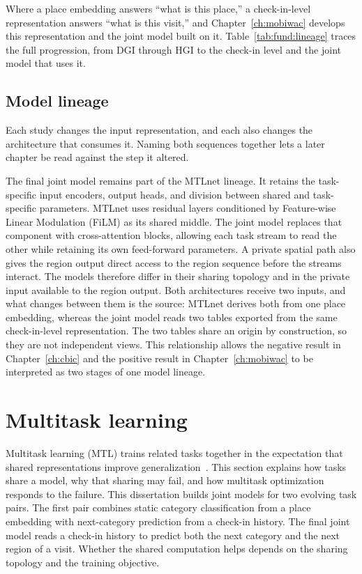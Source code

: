 Where a place embedding answers ``what is this place,'' a check-in-level representation
answers ``what is this visit,'' and
Chapter~\ref{ch:mobiwac} develops this representation and the joint model built on it.
Table~\ref{tab:fund:lineage} traces the full progression, from DGI through HGI to the
check-in level and the joint model that uses it.

\subsection{Model lineage}


Each study changes the input representation, and each also changes the architecture
that consumes it. Naming both sequences together lets a later chapter be read against
the step it altered.

The final joint model remains part of the MTLnet lineage. It retains the task-specific
input encoders, output heads, and division between shared and task-specific parameters.
MTLnet uses residual layers conditioned by Feature-wise Linear Modulation (FiLM) as its
shared middle. The joint model
replaces that component with cross-attention blocks, allowing each task stream to
read the other while retaining its own feed-forward parameters. A private spatial
path also gives the region output direct access to the region sequence before the
streams interact. The models therefore differ in their sharing topology and in the
private input available to the region output. Both architectures receive two inputs,
and what changes between them is the source: MTLnet derives both from one place
embedding, whereas the joint model reads two tables exported from the same check-in-level
representation. The two tables share an origin by construction, so they are not
independent views. This relationship allows the negative
result in Chapter~\ref{ch:cbic} and the positive result in
Chapter~\ref{ch:mobiwac} to be interpreted as two stages of one model lineage.





\section{Multitask learning}
\label{sec:fund:mtl}

Multitask learning (MTL) trains related tasks together in the expectation that shared representations improve
generalization~\cite{caruana1997multitask}. This section explains how tasks share a model,
why that sharing may fail, and how multitask optimization responds to
the failure. This dissertation builds joint models for two evolving task pairs. The first pair combines static category
classification from a place embedding with next-category prediction from a check-in history. The final joint model
reads a check-in history to predict both the next category and the next region of a visit. Whether the shared
computation helps depends on the sharing topology and the training objective.


